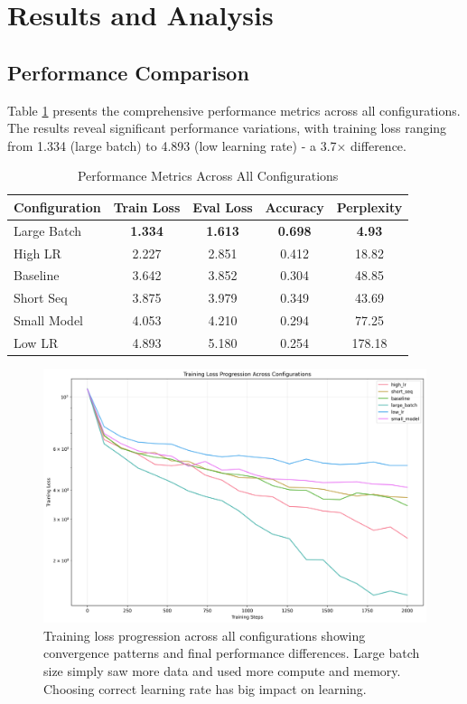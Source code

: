 \documentclass[11pt,a4paper]{article}
\begin{document}
\section{Results and Analysis}

\subsection{Performance Comparison}
Table \ref{tab:performance} presents the comprehensive performance metrics across all configurations. The results reveal significant performance variations, with training loss ranging from 1.334 (large batch) to 4.893 (low learning rate) - a 3.7× difference.

\begin{table}[H]
\centering
\caption{Performance Metrics Across All Configurations}
\label{tab:performance}
\begin{tabular}{@{}lcccc@{}}
\toprule
Configuration & Train Loss & Eval Loss & Accuracy & Perplexity \\
\midrule
Large Batch & \textbf{1.334} & \textbf{1.613} & \textbf{0.698} & \textbf{4.93} \\
High LR & 2.227 & 2.851 & 0.412 & 18.82 \\
Baseline & 3.642 & 3.852 & 0.304 & 48.85 \\
Short Seq & 3.875 & 3.979 & 0.349 & 43.69 \\
Small Model & 4.053 & 4.210 & 0.294 & 77.25 \\
Low LR & 4.893 & 5.180 & 0.254 & 178.18 \\
\bottomrule
\end{tabular}
\end{table}

\begin{figure}[H]
    \centering
    \includegraphics[width=\linewidth]{research/training_loss_comparison.png}
    \caption{Training loss progression across all configurations showing convergence patterns and final performance differences. Large batch size simply saw more data and used more compute and memory. Choosing correct learning rate has big impact on learning.}
    \label{fig:training_loss}
\end{figure}
\end{document}
